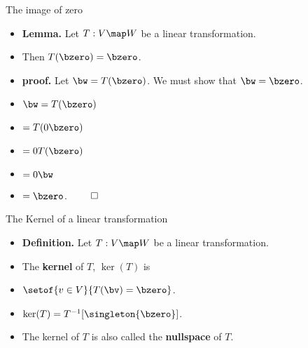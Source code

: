 \documentclass{beamer}
\begin{document}

\begin{frame}{The image of zero}

\begin{itemize}
\item \textbf{Lemma.} Let $T:V\map W$ be a linear transformation.
\item Then $T(\bzero) = \bzero$.
\item \textbf{proof.} Let $\bw = T(\bzero)$. We must show that $\bw=\bzero$.
\item $\bw = T(\bzero)$
\item $= T(0 \bzero)$
\item $= 0 T(\bzero)$
\item $= 0 \bw$
\item $= \bzero$. $\qed$
\end{itemize}

\end{frame}


\begin{frame}{The Kernel of a linear transformation}

\begin{itemize}
\item \textbf{Definition.} Let $T:V\map W$ be a linear transformation.
\item The \textbf{kernel} of $T$, $\ker(T)$ is
\item $\setof{v\in V}{T(\bv) = \bzero}$.
\item $\ker(T) = T^{-1}[\singleton{\bzero}]$.
\item The kernel of $T$ is also called the \textbf{nullspace} of $T$.
\end{itemize}

\end{frame}

\end{document}
